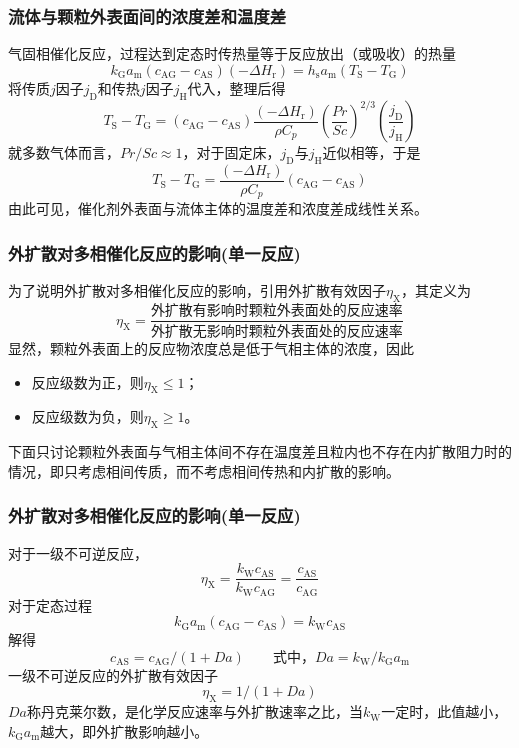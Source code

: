 \documentclass[dvipsnames, svgnames, x11names]{beamer}
\begin{document}
\begin{frame}
    \frametitle{流体与颗粒外表面间的浓度差和温度差}

    气固相催化反应，过程达到定态时传热量等于反应放出（或吸收）的热量
    \[
        k_{\mathrm{G}} a_{\mathrm{m}}(c_{\mathrm{AG}}-c_{\mathrm{AS}})(-\Delta H_{\mathrm{r}})=h_{\mathrm{s}} a_{\mathrm{m}}(T_{\mathrm{S}}-T_{\mathrm{G}})
    \]
    将传质$j$因子$j_\mathrm{D}$和传热$j$因子$j_\mathrm{H}$代入，整理后得
    \[
        T_{\mathrm{S}}-T_{\mathrm{G}}=(c_{\mathrm{AG}}-c_{\mathrm{AS}}) \frac{(-\Delta H_{\mathrm{r}})}{\rho {C}_p}\left(\frac{P r}{S c}\right)^{2 / 3}\left(\frac{j_{\mathrm{D}}}{j_{\mathrm{H}}}\right)
    \]
    就多数气体而言，${P r}/{S c} \approx 1$，对于固定床，$j_\mathrm{D}$与$j_\mathrm{H}$近似相等，于是
    \[
        T_{\mathrm{S}}-T_{\mathrm{G}}=\frac{(-\Delta H_{\mathrm{r}})}{\rho{C_p}}(c_{\mathrm{AG}}-c_{\mathrm{AS}})
    \]
    由此可见，催化剂外表面与流体主体的温度差和浓度差成线性关系。

\end{frame}


\begin{frame}
    \frametitle{外扩散对多相催化反应的影响(单一反应)}

    为了说明外扩散对多相催化反应的影响，引用外扩散有效因子$\eta_\mathrm{X} $，其定义为
    \[
        \eta_\mathrm{X} = \frac{\text{外扩散有影响时颗粒外表面处的反应速率}}{\text{外扩散无影响时颗粒外表面处的反应速率}}
    \]
    显然，颗粒外表面上的反应物浓度总是低于气相主体的浓度，因此
    \begin{itemize}
        \item 反应级数为正，则$\eta_\mathrm{X} \leqslant 1$；
        \item 反应级数为负，则$\eta_\mathrm{X} \geqslant 1$。
    \end{itemize}

    下面只讨论颗粒外表面与气相主体间不存在温度差且粒内也不存在内扩散阻力时的情况，即只考虑相间传质，而不考虑相间传热和内扩散的影响。

\end{frame}


\begin{frame}
    \frametitle{外扩散对多相催化反应的影响(单一反应)}

    对于一级不可逆反应，
    \[
        \eta_{\mathrm{X}}=\frac{k_{\mathrm{W}} c_{\mathrm{AS}}}{k_{\mathrm{W}} c_{\mathrm{AG}}}=\frac{c_{\mathrm{AS}}}{c_{\mathrm{AG}}} 
    \]
    对于定态过程
    \[
        k_{\mathrm{G}} a_{\mathrm{m}}(c_{\mathrm{AG}}-c_{\mathrm{AS}})=k_{\mathrm{W}} c_{\mathrm{AS}}
    \]
    解得
    \[
        c_{\mathrm{AS}}=c_{\mathrm{AG}} /(1+D a) \qquad \text{式中，} D a=k_{\mathrm{W}} / k_{\mathrm{G}} a_{\mathrm{m}}
    \]
    一级不可逆反应的外扩散有效因子
    \[
        \eta_{\mathrm{X}}=1 /(1+D a)
    \]
    $D a$称丹克莱尔数，是化学反应速率与外扩散速率之比，当$k_{\mathrm{W}}$一定时，此值越小，$k_{\mathrm{G}} a_{\mathrm{m}}$越大，即外扩散影响越小。

\end{frame}
\end{document}
